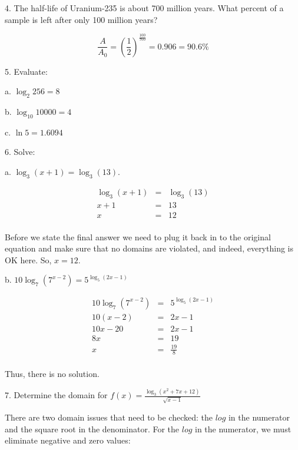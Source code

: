 \documentclass[letterpaper, 12pt]{article}
\begin{document}
\bigskip

4. The half-life of Uranium-235 is about 700 million years. What percent of a
sample is left after only 100 million years?

\bigskip

\[\frac{A}{A_0}=\left(\frac{1}{2}\right)^{\frac{100}{700}}=0.906=90.6\%\]

\bigskip

5. Evaluate:

\bigskip

a. $\log_2 256=8$

\bigskip

b. $\log_{10} 10000=4$

\bigskip

c. $\ln 5=1.6094$

\bigskip

6. Solve:

\bigskip

a. $\log_3(x+1)=\log_3(13)$.

\begin{eqnarray*}
\log_3(x+1) &=& \log_3(13) \\
x+1 &=& 13 \\
x &=& 12 \\
\end{eqnarray*}

Before we state the final answer we need to plug it back in to the original
equation and make sure that no domains are violated, and indeed, everything is
OK here.  So, $x=12$.

\bigskip

b. $10\log_7(7^{x-2})=5^{\log_5(2x-1)}$

\begin{eqnarray*}
10\log_7(7^{x-2}) &=& 5^{\log_5(2x-1)} \\
10(x-2) &=& 2x-1 \\
10x-20 &=& 2x-1 \\
8x &=& 19 \\
x &=& \frac{19}{8} \\
\end{eqnarray*}

Thus, there is no solution.

\bigskip

7. Determine the domain for $f(x)=\frac{\log_3(x^2+7x+12)}{\sqrt{x-1}}$

\bigskip

There are two domain issues that need to be checked: the $log$ in the numerator
and the square root in the denominator.  For the $log$ in the numerator, we
must eliminate negative and zero values:
\end{document}
